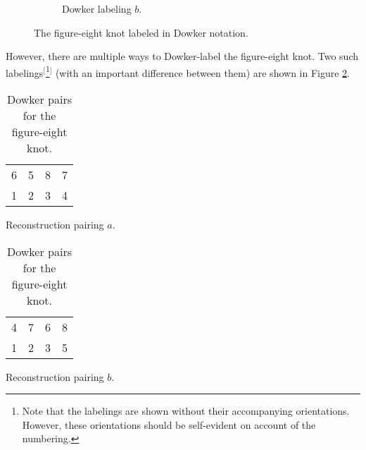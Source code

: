 \documentclass[titlepage,11pt]{article}
\begin{document}
\begin{figure}[h!]
\begin{subfigure}[b]{0.3\linewidth}
        \caption{Dowker labeling $b$.}
        \label{fig:fig8Dowkerb}
    \end{subfigure}
    \caption{The figure-eight knot labeled in Dowker notation.}
    \label{fig:fig8Dowker}
\end{figure}

However, there are multiple ways to Dowker-label the figure-eight knot. Two such labelings$^[$\footnote{Note that the labelings are shown without their accompanying orientations. However, these orientations should be self-evident on account of the numbering.}$^]$ (with an important difference between them) are shown in Figure \ref{fig:fig8Dowker}.\par

\begin{table}[h!]
    \centering
    \begin{subtable}[b]{0.3\linewidth}
        \centering
        \begin{tabular}{cccc}
            6 & 5 & 8 & 7\\
            1 & 2 & 3 & 4
        \end{tabular}
        \caption{Reconstruction pairing $a$.}
        \label{tab:fig8Dowkera}
    \end{subtable}
    \begin{subtable}[b]{0.3\linewidth}
        \centering
        \begin{tabular}{cccc}
            4 & 7 & 6 & 8\\
            1 & 2 & 3 & 5
        \end{tabular}
        \caption{Reconstruction pairing $b$.}
        \label{tab:fig8Dowkerb}
    \end{subtable}
    \caption{Dowker pairs for the figure-eight knot.}
    \label{tab:fig8Dowker}
\end{table}
\end{document}
